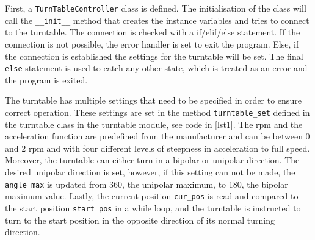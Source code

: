 First, a \verb+TurnTableController+ class is defined. The initialisation of the class will call the \verb+__init__+ method that creates the instance variables and tries to connect to the turntable. The connection is checked with a if/elif/else statement. If the connection is not possible, the error handler is set to exit the program. Else, if the connection is established the settings for the turntable will be set. The final \verb+else+ statement is used to catch any other state, which is treated as an error and the program is exited.

The turntable has multiple settings that need to be specified in order to ensure correct operation. These settings are set in the method \verb+turntable_set+ defined in the turntable class in the turntable module, see code in \ref{lst1}. The rpm and the acceleration function are predefined from the manufacturer and can be between 0 and 2 rpm and with four different levels of steepness in acceleration to full speed. Moreover, the turntable can either turn in a bipolar or unipolar direction. The desired unipolar direction is set, however, if this setting can not be made, the \verb+angle_max+ is updated from 360, the unipolar maximum, to 180, the bipolar maximum value. Lastly, the current position \verb+cur_pos+ is read and compared to the start position \verb+start_pos+ in a while loop, and the turntable is instructed to turn to the start position in the opposite direction of its normal turning direction.

